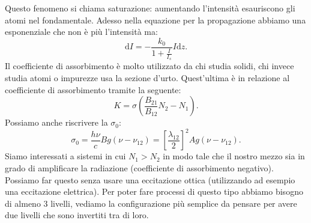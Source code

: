 Questo fenomeno si chiama saturazione: aumentando l'intensità esauriscono gli atomi nel fondamentale. Adesso nella equazione per la propagazione abbiamo una esponenziale che non è più l'intensità ma:
\[
    \text{d}I=-\frac{k_0}{1+\frac{I}{I_s}}I \text{d}z
.\] 
Il coefficiente di assorbimento è molto utilizzato da chi studia solidi, chi invece studia atomi o impurezze usa la sezione d'urto. Quest'ultima è in relazione al coefficiente di assorbimento tramite la seguente:
\[
    K = \sigma\left(\frac{B_{21}}{B_{12}}N_2-N_1\right)
.\] 
Possiamo anche riscrivere la $\sigma_0$:
\[
    \sigma_0=\frac{h\nu}{c}Bg(\nu-\nu_{12}) =
    \left[\frac{\lambda_{12}}{2}\right]^2Ag(\nu-\nu_{12}) 
.\] 
Siamo interessati a sistemi in cui $N_1>N_2$ in modo tale che il nostro mezzo sia in grado di amplificare la radiazione (coefficiente di assorbimento negativo). Possiamo far questo senza usare una eccitazione ottica (utilizzando ad esempio una eccitazione elettrica). Per poter fare processi di questo tipo abbiamo bisogno di almeno 3 livelli, vediamo la configurazione  più semplice da pensare per avere due livelli che sono invertiti tra di loro.
